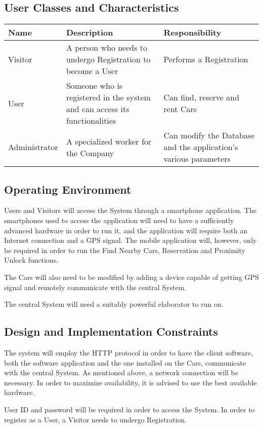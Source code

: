 \documentclass[12pt]{article}
\begin{document}
\subsection{User Classes and Characteristics}
\begin{center}
  \begin{tabular}{|p{}|p{}|p{}|}
    \hline
    \textbf{Name} & \textbf{Description} & \textbf{Responsibility} \\ \hline
    Visitor & A person who needs to undergo Registration to become a User & Performs a Registration \\ \hline
    User & Someone who is registered in the system and can access its functionalities & Can find, reserve and rent Cars \\ \hline
    Administrator & A specialized worker for the Company & Can modify the Database and the application's various parameters \\ \hline
  \end{tabular}
\end{center}
\subsection{Operating Environment}\label{OE}
Users and Visitors will access the System through a smartphone application. The smartphones used to access the application will need to have a sufficiently advanced hardware in order to run it, and the application will require both an Internet connection and a GPS signal. The mobile application will, however, only be required in order to run the Find Nearby Cars, Reservation and Proximity Unlock functions.

The Cars will also need to be modified by adding a device capable of getting GPS signal and remotely communicate with the central System.

The central System will need a suitably powerful elaborator to run on.
\subsection{Design and Implementation Constraints}
The system will employ the HTTP protocol in order to have the client software, both the software application and the one installed on the Cars, communicate with the central System. As mentioned above, a network connection will be necessary. In order to maximize availability, it is advised to use the best available hardware.

User ID and password will be required in order to access the System. In order to register as a User, a Visitor needs to undergo Registration. 
\end{document}
